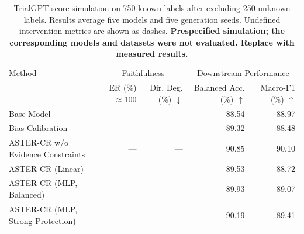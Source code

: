 \begin{table}[t]
\centering
\small
\setlength{\tabcolsep}{3pt}
\begin{tabularx}{\textwidth}{@{}>{\raggedright\arraybackslash}Xrrrr@{}}
\toprule
Method & \multicolumn{2}{c}{Faithfulness} & \multicolumn{2}{c}{Downstream Performance} \\
\cmidrule(lr){2-3}\cmidrule(lr){4-5}
 & \shortstack{ER\\ (\%) $\approx$100} & \shortstack{Dir. Deg.\\ (\%) $\downarrow$} & \shortstack{Balanced Acc.\\ (\%) $\uparrow$} & \shortstack{Macro-F1\\ (\%) $\uparrow$} \\
\midrule
Base Model & — & — & 88.54 & 88.97 \\
Bias Calibration & — & — & 89.32 & 88.48 \\
ASTER-CR w/o Evidence Constraints & — & — & 90.85 & 90.10 \\
ASTER-CR (Linear) & — & — & 89.53 & 88.72 \\
ASTER-CR (MLP, Balanced) & — & — & 89.93 & 89.07 \\
ASTER-CR (MLP, Strong Protection) & — & — & 90.19 & 89.41 \\
\bottomrule
\end{tabularx}
\caption{TrialGPT score simulation on 750 known labels after excluding 250 unknown labels. Results average five models and five generation seeds. Undefined intervention metrics are shown as dashes. \textbf{Prespecified simulation; the corresponding models and datasets were not evaluated. Replace with measured results.}}
\label{tab:aster-main-17}
\end{table}

